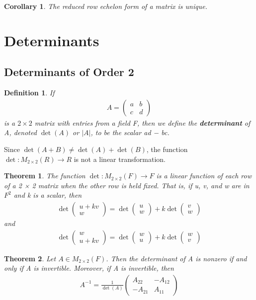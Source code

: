\documentclass{article}
\newcommand{\bd}[1]{\textbf{#1}}
\newcommand*\bpmat[0]{\begin{pmatrix}}
\newcommand*\epmat[0]{\end{pmatrix}}
\theoremstyle{plain}
\newtheorem{theorem}{Theorem}[section]
\newtheorem*{corollary}{Corollary}
\newtheorem*{definition1}{Definition}
\theoremstyle{plain} %
\begin{document}
\begin{corollary}
  The reduced row echelon form of a matrix is unique.
\end{corollary}

\section{Determinants}

\subsection{Determinants of Order 2}

\begin{definition1}
  If 
\begin{align*}
  A=\bpmat a&b\\c&d\epmat
\end{align*}
is a $2\times 2$ matrix with entries from a field F, then we define the \bd{determinant} of A, denoted $\det(A)$ or $|A|$, to be the scalar ad − bc.
\end{definition1}

Since $\det(A + B) \neq \det(A) + \det(B)$, the function $\det: M_{2\times 2}(R) \to R$ is not a linear transformation.

\begin{theorem}
  The function $\det: M_{2\times 2}(F) \to F$ is a linear function of each row of a 2 × 2 matrix when the other row is held fixed. That is, if u, v, and w are in $F^2$ and k is a scalar, then
  \begin{align*}
    \det\bpmat u+kv\\w\epmat =\det\bpmat u\\w\epmat +k\det \bpmat v\\w\epmat
  \end{align*}
  and
  \begin{align*}
    \det\bpmat w\\u+kv\epmat = \det\bpmat w\\u\epmat +k\det\bpmat w\\v\epmat
  \end{align*}
\end{theorem}

\begin{theorem}
  Let $A \in M_{2\times 2}(F)$. Then the determinant of A is nonzero if and only if A is invertible. Moreover, if A is invertible, then
  \begin{align*}
    A^{-1}=\frac{1}{\det(A)}\bpmat A_{22}&-A_{12}\\-A_{21}&A_{11}\epmat
  \end{align*}
\end{theorem}
\end{document}
